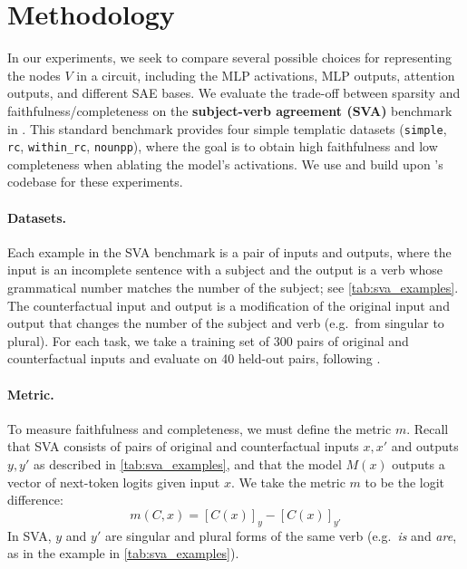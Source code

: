 \documentclass{article}
\theoremstyle{plain}
\theoremstyle{definition}
\theoremstyle{remark}
\begin{document}
\section{Methodology}
\label{sec:methodology}

In our experiments, we seek to compare several possible choices for representing the nodes $V$ in a circuit, including the MLP activations, MLP outputs, attention outputs, and different SAE bases. We evaluate the trade-off between sparsity and faithfulness/completeness on the \textbf{subject-verb agreement (SVA)} benchmark in \citet{marks2025sparse}. This standard benchmark provides four simple templatic datasets (\texttt{simple}, \texttt{rc}, \texttt{within\_rc}, \texttt{nounpp}), where the goal is to obtain high faithfulness and low completeness when ablating the model's activations. We use and build upon \citeauthor{marks2025sparse}'s codebase for these experiments.

\paragraph{Datasets.} Each example in the SVA benchmark is a pair of inputs and outputs, where the input is an incomplete sentence with a subject and the output is a verb whose grammatical number matches the number of the subject; see \cref{tab:sva_examples}. The counterfactual input and output is a modification of the original input and output that changes the number of the subject and verb (e.g.~from singular to plural).
For each task, we take a training set of 300 pairs of original and
counterfactual inputs and evaluate on 40 held-out pairs, following \citet{marks2025sparse}.

\paragraph{Metric.} 
To measure faithfulness and completeness, we must define the metric $m$. Recall that SVA consists of pairs of original and counterfactual inputs $x, x'$ and outputs $y, y'$ as described in \cref{tab:sva_examples}, and that
the model $M(x)$ outputs a vector of next-token logits given input $x$. We take
the metric $m$ to be the logit difference:
\begin{equation}
m(C, x) = \left[C(x)\right]_y - \left[C(x)\right]_{y'}
\end{equation}
In SVA, $y$ and $y'$ are singular and plural forms of the same verb (e.g.~\textit{is} and \textit{are}, as in the example in \cref{tab:sva_examples}).
\end{document}
